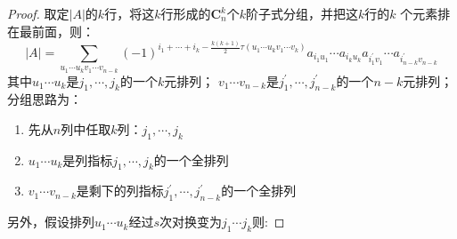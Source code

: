 \begin{proof}
    取定$|A|$的$k$行，将这$k$行形成的$\mathbf{C}_n^k$个$k$阶子式分组，并把这$k$行的$k$
    个元素排在最前面，则：
    \begin{equation*}
        |A| = \sum_{u_1 \cdots u_k v_1 \cdots v_{n-k}}^{} (-1)^{i_1 + \cdots + i_k - \frac{k(k+1)}{2} \tau(u_1 \cdots u_k v_1 \cdots v_k)} 
        a_{i_1 u_1} \cdots a_{i_k u_k} a_{i_{1}^{'} v_1} \cdots a_{i_{n-k}^{'} v_{n-k}}
    \end{equation*}
    其中$u_1 \cdots u_k$是$j_1,\cdots, j_k$的一个$k$元排列；
    $v_1 \cdots v_{n-k}$是$j_{1}^{'},\cdots, j_{n-k}^{'}$的一个$n-k$元排列；
    分组思路为：
    \begin{enumerate}
        \item 先从$n$列中任取$k$列：$j_1,\cdots, j_k$
        \item $u_1 \cdots u_k$是列指标$j_1,\cdots, j_k$的一个全排列
        \item $v_1 \cdots v_{n-k}$是剩下的列指标$j_{1}^{'},\cdots, j_{n-k}^{'}$的一个全排列
    \end{enumerate}
    另外，假设排列$u_1 \cdots u_k$经过$s$次对换变为$j_1 \cdots j_k$则:
     

\end{proof}

